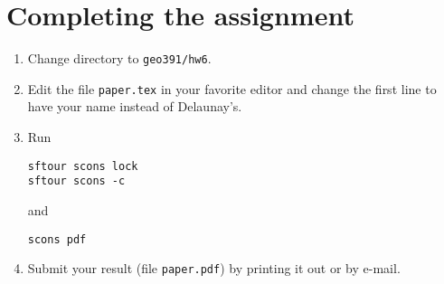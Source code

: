 \section{Completing the assignment}

\begin{enumerate}
\item Change directory to \verb#geo391/hw6#.
\item Edit the file \texttt{paper.tex} in your favorite editor and change the
  first line to have your name instead of Delaunay's.
\item Run
\begin{verbatim}
sftour scons lock
sftour scons -c
\end{verbatim}
and
\begin{verbatim}
scons pdf
\end{verbatim}
\item Submit your result (file \texttt{paper.pdf}) by printing it out
  or by e-mail.
\end{enumerate}





